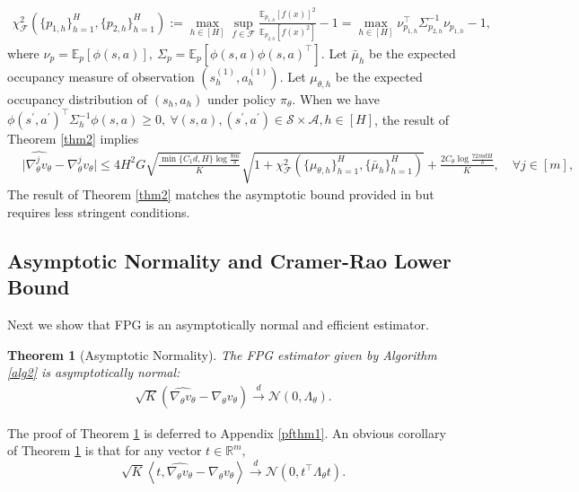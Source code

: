 \documentclass{article}
\newtheorem{theorem}{Theorem}[section]
\numberwithin{equation}{section}
\begin{document}
\begin{align*}
    \chi^2_{\mathcal{F}}(\{p_{1,h}\}_{h=1}^H,\{p_{2,h}\}_{h=1}^H):=\max_{h\in[H]}\sup_{f\in\mathcal{F}}\frac{\mathbb{E}_{p_{1,h}}\left[f(x)\right]^2}{\mathbb{E}_{p_{2,h}}\left[f(x)^2\right]}-1 = \max_{h\in[H]}\nu_{p_{1,h}}^\top\Sigma^{-1}_{p_{2,h}}\nu_{p_{1,h}}-1,
\end{align*}
where $\nu_{p}=\mathbb{E}_p[\phi(s,a)],\ \Sigma_p=\mathbb{E}_p[\phi(s,a)\phi(s,a)^\top]$. Let $\bar{\mu}_h$ be the expected occupancy measure of observation $\left(s_h^{(1)},a_h^{(1)}\right)$. Let $\mu_{\theta,h}$ be the expected occupancy distribution of $(s_h,a_h)$ under policy $\pi_\theta$. When we have $\phi(s^\prime,a^\prime)^\top\Sigma_{h}^{-1}\phi(s,a)\geq 0,\ \forall (s,a),(s^\prime,a^\prime)\in\mathcal{S}\times\mathcal{A},h\in[H]$, the result of Theorem \ref{thm2} implies 
\begin{align*}
&\vert\widehat{\nabla_\theta^j v_\theta}-\nabla_\theta^j v_\theta\vert\leq 4H^2G\sqrt{\frac{\min\{C_1d,H\}\log\frac{8m}{\delta}}{K}}\sqrt{1+\chi_{\mathcal{F}}^2(\{\mu_{\theta,h}\}_{h=1}^H,\{\bar{\mu}_h\}_{h=1}^H)}+\frac{2C_\theta\log\frac{72mdH}{\delta}}{K},\quad\forall j\in[m],
\end{align*}
The result of Theorem \ref{thm2} matches the asymptotic bound provided in \cite{kallus2020statistically} but requires less stringent conditions. 

\subsection{Asymptotic Normality and Cramer-Rao Lower Bound}
Next we show that FPG is an asymptotically normal and efficient estimator. 
\begin{theorem}[Asymptotic Normality]
\label{thm1}
The FPG estimator given by Algorithm \ref{alg2} is asymptotically normal:
\begin{align*}
    \sqrt{K}\left(\widehat{\nabla_\theta v_\theta}-\nabla_\theta v_\theta\right)\stackrel{d}{\rightarrow}\mathcal{N}(0,\Lambda_\theta).
\end{align*}
\end{theorem}
The proof of Theorem \ref{thm1} is deferred to Appendix \ref{pfthm1}. An obvious corollary of Theorem \ref{thm1} is that for any vector $t \in \mathbb{R}^m,$ 
\begin{equation*}
    \sqrt{K}\left\langle t,  \widehat{\nabla_{\theta} v_{\theta}} -\nabla_{\theta} v_{\theta} \right\rangle \stackrel{d}{\rightarrow} \mathcal{N}\left(0, t^{\top} \Lambda_{\theta} t\right).
\end{equation*}
\end{document}
